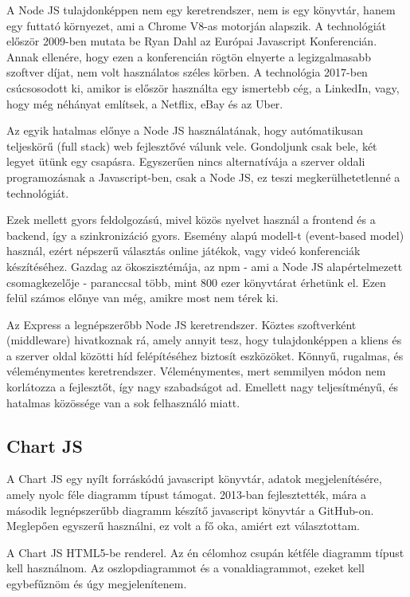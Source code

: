 A Node JS tulajdonképpen nem egy keretrendszer, nem is egy könyvtár, hanem egy futtató környezet, ami a Chrome V8-as motorján alapszik. A technológiát először 2009-ben mutata be Ryan Dahl az Európai Javascript Konferencián. Annak ellenére, hogy ezen a konferencián rögtön elnyerte a legizgalmasabb szoftver díjat, nem volt használatos széles körben. A technológia 2017-ben csúcsosodott ki, amikor is először használta egy ismertebb cég, a LinkedIn, vagy, hogy még néhányat említsek, a Netflix, eBay és az Uber.

Az egyik hatalmas előnye a Node JS használatának, hogy autómatikusan teljeskörű (full stack) web fejlesztővé válunk vele. Gondoljunk csak bele, két legyet ütünk egy csapásra. Egyszerűen nincs alternatívája a szerver oldali programozásnak a Javascript-ben, csak a Node JS, ez teszi megkerülhetetlenné a technológiát.

Ezek mellett gyors feldolgozású, mivel közös nyelvet használ a frontend és a backend, így a szinkronizáció gyors. Esemény alapú modell-t (event-based model) használ, ezért népszerű választás online játékok, vagy videó konferenciák készítéséhez. Gazdag az ökoszisztémája, az npm - ami a Node JS alapértelmezett csomagkezelője - paranccsal több, mint 800 ezer könyvtárat érhetünk el. Ezen felül számos előnye van még, amikre most nem térek ki.

Az Express a legnépszerőbb Node JS keretrendszer. Köztes szoftverként (middleware) hivatkoznak rá, amely annyit tesz, hogy tulajdonképpen a kliens és a szerver oldal közötti híd felépítéséhez biztosít eszközöket. Könnyű, rugalmas, és véleménymentes keretrendszer. Véleménymentes, mert semmilyen módon nem korlátozza a fejlesztőt, így nagy szabadságot ad. Emellett nagy teljesítményű, és hatalmas közössége van a sok felhasználó miatt.
\cite{node}

\subsection{Chart JS}
A Chart JS egy nyílt forráskódú javascript könyvtár, adatok megjelenítésére, amely nyolc féle diagramm típust támogat. 2013-ban fejlesztették, mára a második legnépszerűbb diagramm készítő javascript könyvtár a GitHub-on. Meglepően egyszerű használni, ez volt a fő oka, amiért ezt választottam. 

A Chart JS HTML5-be renderel. Az én célomhoz csupán kétféle diagramm típust kell használnom. Az oszlopdiagrammot és a vonaldiagrammot, ezeket kell egybefűznöm és úgy megjelenítenem.
\cite{chartjs}

